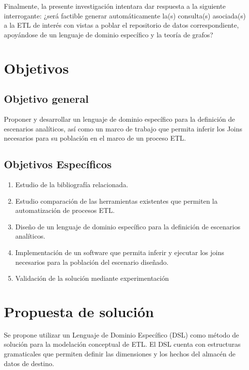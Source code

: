 Finalmente, la presente investigación intentara dar respuesta a la siguiente interrogante: ¿será factible generar 
automáticamente la(s) consulta(s) asociada(s) a la ETL de interés con vistas a poblar el repositorio de datos 
correspondiente, apoy\'andose de un lenguaje de dominio espec\'ifico y la teor\'ia de grafos?

\section{Objetivos}

\subsection{Objetivo general}

Proponer y desarrollar un lenguaje de dominio específico para la definici\'on de escenarios analíticos, as\'i como un marco de trabajo que permita 
inferir los Joins necesarios para su población en el marco de un proceso ETL.

\subsection{Objetivos Espec\'ificos}

\begin{enumerate}
    \item Estudio de la bibliografía relacionada. 
    \item Estudio comparación de las herramientas existentes que permiten la automatización de procesos ETL.
    \item Diseño de un lenguaje de dominio específico para la definici\'on de escenarios analíticos.
    \item Implementación de un software que permita inferir y ejecutar los joins necesarios para la población del escenario diseñado.
    \item Validación de la solución mediante experimentación
\end{enumerate}

\section{Propuesta de soluci\'on}

Se propone utilizar un Lenguaje de Dominio Específico (DSL) como método de solución para la modelación conceptual de ETL. 
El DSL cuenta con estructuras gramaticales que permiten definir las dimensiones y los hechos del almacén de datos de 
destino.

